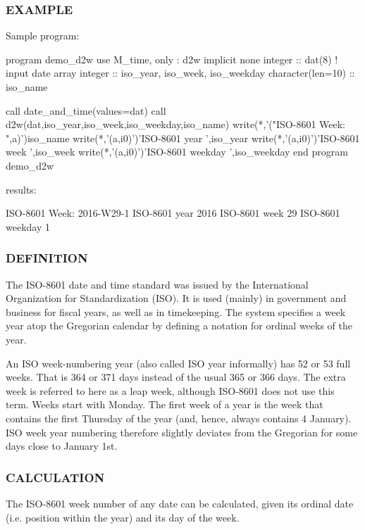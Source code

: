 \subsubsection*{E\+X\+A\+M\+P\+LE}

\begin{DoxyVerb}Sample program:

 program demo_d2w
 use M_time, only : d2w
 implicit none
 integer           :: dat(8)     ! input date array
 integer           :: iso_year, iso_week, iso_weekday
 character(len=10) :: iso_name

    call date_and_time(values=dat)
    call d2w(dat,iso_year,iso_week,iso_weekday,iso_name)
    write(*,'("ISO-8601 Week:   ",a)')iso_name
    write(*,'(a,i0)')'ISO-8601 year    ',iso_year
    write(*,'(a,i0)')'ISO-8601 week    ',iso_week
    write(*,'(a,i0)')'ISO-8601 weekday ',iso_weekday
 end program demo_d2w

results:

 ISO-8601 Week:   2016-W29-1
 ISO-8601 year    2016
 ISO-8601 week    29
 ISO-8601 weekday 1
\end{DoxyVerb}


\subsubsection*{D\+E\+F\+I\+N\+I\+T\+I\+ON}

The I\+S\+O-\/8601 date and time standard was issued by the International Organization for Standardization (I\+SO). It is used (mainly) in government and business for fiscal years, as well as in timekeeping. The system specifies a week year atop the Gregorian calendar by defining a notation for ordinal weeks of the year.

An I\+SO week-\/numbering year (also called I\+SO year informally) has 52 or 53 full weeks. That is 364 or 371 days instead of the usual 365 or 366 days. The extra week is referred to here as a leap week, although I\+S\+O-\/8601 does not use this term. Weeks start with Monday. The first week of a year is the week that contains the first Thursday of the year (and, hence, always contains 4 January). I\+SO week year numbering therefore slightly deviates from the Gregorian for some days close to January 1st.

\subsubsection*{C\+A\+L\+C\+U\+L\+A\+T\+I\+ON}

The I\+S\+O-\/8601 week number of any date can be calculated, given its ordinal date (i.\+e. position within the year) and its day of the week.

